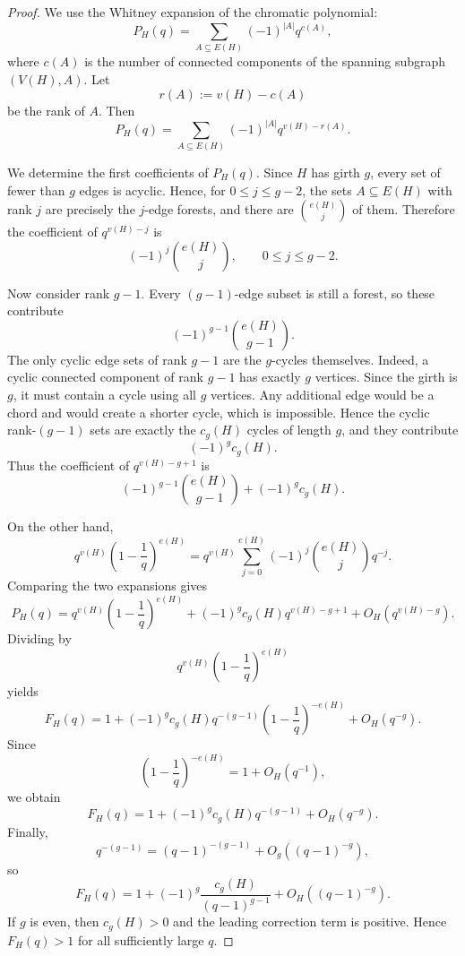 \documentclass[11pt]{article}
\begin{document}
\begin{proof}
We use the Whitney expansion of the chromatic polynomial:
\[
    P_H(q)
    =
    \sum_{A\subseteq E(H)}
    (-1)^{|A|} q^{c(A)},
\]
where \(c(A)\) is the number of connected components of the spanning
subgraph \((V(H),A)\).  Let
\[
    r(A):=v(H)-c(A)
\]
be the rank of \(A\).  Then
\[
    P_H(q)
    =
    \sum_{A\subseteq E(H)}
    (-1)^{|A|} q^{v(H)-r(A)}.
\]

We determine the first coefficients of \(P_H(q)\).  Since \(H\) has
girth \(g\), every set of fewer than \(g\) edges is acyclic.  Hence, for
\(0\leq j\leq g-2\), the sets \(A\subseteq E(H)\) with rank \(j\) are
precisely the \(j\)-edge forests, and there are \(\binom{e(H)}{j}\) of
them.  Therefore the coefficient of \(q^{v(H)-j}\) is
\[
    (-1)^j \binom{e(H)}{j},
    \qquad 0\leq j\leq g-2.
\]

Now consider rank \(g-1\).  Every \((g-1)\)-edge subset is still a
forest, so these contribute
\[
    (-1)^{g-1}\binom{e(H)}{g-1}.
\]
The only cyclic edge sets of rank \(g-1\) are the \(g\)-cycles
themselves.  Indeed, a cyclic connected component of rank \(g-1\) has
exactly \(g\) vertices.  Since the girth is \(g\), it must contain a
cycle using all \(g\) vertices.  Any additional edge would be a chord and
would create a shorter cycle, which is impossible.  Hence the cyclic
rank-\((g-1)\) sets are exactly the \(c_g(H)\) cycles of length \(g\),
and they contribute
\[
    (-1)^g c_g(H).
\]
Thus the coefficient of \(q^{v(H)-g+1}\) is
\[
    (-1)^{g-1}\binom{e(H)}{g-1}
    +
    (-1)^g c_g(H).
\]

On the other hand,
\[
    q^{v(H)}
    \left(1-\frac1q\right)^{e(H)}
    =
    q^{v(H)}
    \sum_{j=0}^{e(H)}
    (-1)^j \binom{e(H)}{j} q^{-j}.
\]
Comparing the two expansions gives
\[
    P_H(q)
    =
    q^{v(H)}
    \left(1-\frac1q\right)^{e(H)}
    +
    (-1)^g c_g(H) q^{v(H)-g+1}
    +
    O_H(q^{v(H)-g}).
\]
Dividing by
\[
    q^{v(H)}
    \left(1-\frac1q\right)^{e(H)}
\]
yields
\[
    F_H(q)
    =
    1
    +
    (-1)^g c_g(H) q^{-(g-1)}
    \left(1-\frac1q\right)^{-e(H)}
    +
    O_H(q^{-g}).
\]
Since
\[
    \left(1-\frac1q\right)^{-e(H)}
    =
    1+O_H(q^{-1}),
\]
we obtain
\[
    F_H(q)
    =
    1
    +
    (-1)^g c_g(H) q^{-(g-1)}
    +
    O_H(q^{-g}).
\]
Finally,
\[
    q^{-(g-1)}
    =
    (q-1)^{-(g-1)}
    +
    O_g\!\left((q-1)^{-g}\right),
\]
so
\[
    F_H(q)
    =
    1
    +
    (-1)^g \frac{c_g(H)}{(q-1)^{g-1}}
    +
    O_H\!\left((q-1)^{-g}\right).
\]
If \(g\) is even, then \(c_g(H)>0\) and the leading correction term is
positive.  Hence \(F_H(q)>1\) for all sufficiently large \(q\).
\end{proof}
\end{document}
